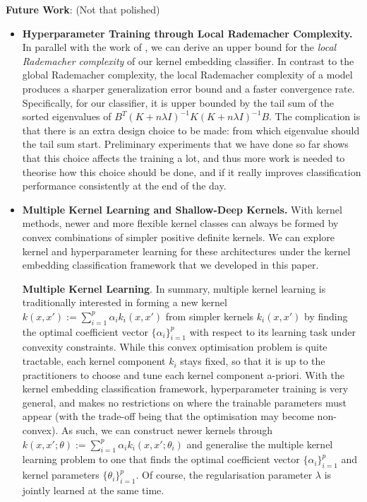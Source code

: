 \documentclass{article}
\newcommand{\note}[1]{{\color{orange} #1}}
\begin{document}
	\textbf{Future Work}: \note{(Not that polished)}
	
	\begin{itemize}
		\item \textbf{Hyperparameter Training through Local Rademacher Complexity.} In parallel with the work of \cite{xu2016local}, we can derive an upper bound for the \textit{local Rademacher complexity} of our kernel embedding classifier. In contrast to the global Rademacher complexity, the local Rademacher complexity of a model produces a sharper generalization error bound and a faster convergence rate. Specifically, for our classifier, it is upper bounded by the tail sum of the sorted eigenvalues of $B^{T} (K + n \lambda I)^{-1} K (K + n \lambda I)^{-1} B$. The complication is that there is an extra design choice to be made: from which eigenvalue should the tail sum start. Preliminary experiments that we have done so far shows that this choice affects the training a lot, and thus more work is needed to theorise how this choice should be done, and if it really improves classification performance consistently at the end of the day.

		\item \textbf{Multiple Kernel Learning and Shallow-Deep Kernels.} With kernel methods, newer and more flexible kernel classes can always be formed by convex combinations of simpler positive definite kernels. We can explore kernel and hyperparameter learning for these architectures under the kernel embedding classification framework that we developed in this paper.
		
		\textbf{Multiple Kernel Learning}. In summary, multiple kernel learning is traditionally interested in forming a new kernel $k(x, x') := \sum_{i = 1}^{p} \alpha_{i} k_{i}(x, x')$ from simpler kernels $k_{i}(x, x')$ by finding the optimal coefficient vector $\{\alpha_{i}\}_{i = 1}^{p}$ with respect to its learning task under convexity constraints. While this convex optimisation problem is quite tractable, each kernel component $k_{i}$ stays fixed, so that it is up to the practitioners to choose and tune each kernel component a-priori. With the kernel embedding classification framework, hyperparameter training is very general, and makes no restrictions on where the trainable parameters must appear (with the trade-off being that the optimisation may become non-convex). As such, we can construct newer kernels through $k(x, x'; \theta) := \sum_{i = 1}^{p} \alpha_{i} k_{i}(x, x'; \theta_{i})$ and generalise the multiple kernel learning problem to one that finds the optimal coefficient vector $\{\alpha_{i}\}_{i = 1}^{p}$ and kernel parameters $\{\theta_{i}\}_{i = 1}^{p}$. Of course, the regularisation parameter $\lambda$ is jointly learned at the same time.
		

\end{itemize}
\end{document}
